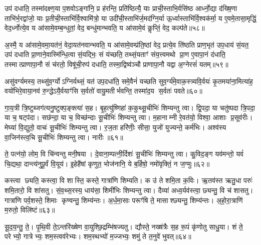 उप॑ दधाति॒ तस्मा॑दक्ष्ण॒या प॒शवोऽङ्गा॑नि॒ प्र ह॑रन्ति॒ प्रति॑ष्ठित्यै॒ याः प्राची॒स्ताभि॒र्वसि॑ष्ठ आर्ध्नो॒द्या द॑ख्षि॒णा ताभि॑र्भ॒रद्वा॑जो॒ याः प्र॒तीची॒स्ताभि॑र्वि॒श्वामि॑त्रो॒ या उदी॑ची॒स्ताभि॑र्ज॒मद॑ग्नि॒र्या ऊ॒र्ध्वास्ताभि॑र्वि॒श्वक॑र्मा॒ य ए॒वमे॒तासा॒मृद्धिं॒ वेद॒र्ध्नोत्ये॒व य आ॑सामे॒वम्ब॒न्धुतां॒ वेद॒ बन्धु॑मान्भवति॒ य आ॑सामे॒वं कॢप्तिं॒ वेद॒ कल्प॑ते॥५८॥

अ॒स्मै॒ य आ॑सामे॒वमा॒यत॑नं॒ वेदा॒यत॑नवान्भवति॒ य आ॑सामे॒वम्प्र॑ति॒ष्ठां वेद॒ प्रत्ये॒व ति॑ष्ठति प्राण॒भृत॑ उप॒धाय॑ सं॒यत॒ उप॑ दधाति प्रा॒णाने॒वास्मि॑न्धि॒त्वा सं॒यद्भिः॒ सं य॑च्छति॒ तथ्सं॒यताꣳ॑ संय॒त्त्वमथो प्रा॒ण ए॒वापा॒नं द॑धाति॒ तस्मात्प्राणापा॒नौ सं च॑रतो॒ विषू॑ची॒रुप॑ दधाति॒ तस्मा॒द्विष्व॑ञ्चौ प्राणापा॒नौ यद्वा अ॒ग्नेरसं॑ यतम्॥५९॥

असु॑वर्ग्यमस्य॒ तथ्सु॑व॒र्ग्योऽग्निर्यथ्सं॒ यत॑ उप॒दधा॑ति॒ समे॒वैनं॑ यच्छति सुव॒र्ग्य॑मे॒वाक॒स्त्र्यवि॒र्वयः॑ कृ॒तमया॑ना॒मित्या॑ह॒ वयो॑भिरे॒वाया॒नव॑ रु॒न्द्धेऽयै॒र्वयाꣳ॑सि स॒र्वतो॑ वायु॒मतीर्भवन्ति॒ तस्मा॑द॒य स॒र्वतः॑ पवते॥६०॥

{\anuvakamend[{प॒श्चादे॒ताः पु॒रोऽक्ष्ण॒या कल्प॒तेऽसं॑ यत॒म्पञ्च॑त्रिशच्च॥10॥}]}

गा॒य॒त्री त्रि॒ष्टुब्जग॑त्यनु॒ष्टुक्प॒ङ्क्त्या॑ स॒ह। बृ॒ह॒त्यु॑ष्णिहा॑ क॒कुथ्सू॒चीभिः॑ शिम्यन्तु त्वा। द्वि॒पदा॒ या चतु॑ष्पदा त्रि॒पदा॒ या च॒ षट्प॑दा। सछ॑न्दा॒ या च॒ विच्छ॑न्दाः सू॒चीभिः॑ शिम्यन्तु त्वा। म॒हानाम्नी रे॒वत॑यो॒ विश्वा॒ आशाः प्र॒सूव॑रीः। मेघ्या॑ वि॒द्युतो॒ वाचः॑ सू॒चीभिः॑ शिम्यन्तु त्वा। र॒ज॒ता हरि॑णीः॒ सीसा॒ युजो॑ युज्यन्ते॒ कर्म॑भिः। अश्व॑स्य वा॒जिन॑स्त्व॒चि सू॒चीभिः॑ शिम्यन्तु त्वा। नारीः॥६१॥

ते॒ पत्न॑यो॒ लोम॒ वि चि॑न्वन्तु मनी॒षया। दे॒वाना॒म्पत्नी॒र्दिशः॑ सू॒चीभिः॑ शिम्यन्तु त्वा। कु॒विद॒ङ्ग यव॑मन्तो॒ यवं॑ चि॒द्यथा॒ दान्त्य॑नुपू॒र्वं वि॒यूय॑। इ॒हेहै॑षां कृणुत॒ भोज॑नानि॒ ये ब॒र्\mbox{}हिषो॒ नमो॑वृक्तिं॒ न ज॒ग्मुः॥६२॥

{\anuvakamend[{नारीस्त्रि॒ꣳ॒शच्च॑॥11॥}]}

कस्त्वा छ्यति॒ कस्त्वा॒ वि शास्ति॒ कस्ते॒ गात्रा॑णि शिम्यति। क उ॑ ते शमि॒ता क॒विः। ऋ॒तव॑स्त ऋतु॒धा परुः॑ शमि॒तारो॒ वि शा॑सतु। सं॒व॒थ्स॒रस्य॒ धाय॑सा॒ शिमी॑भिः शिम्यन्तु त्वा। दैव्या॑ अध्व॒र्यव॑स्त्वा॒ छ्यन्तु॒ वि च॑ शासतु। गात्रा॑णि पर्व॒शस्ते॒ शिमाः कृण्वन्तु॒ शिम्य॑न्तः। अ॒र्ध॒मा॒साः परूꣳ॑षि ते॒ मासाश्छ्यन्तु॒ शिम्य॑न्तः। अ॒हो॒रा॒त्राणि॑ म॒रुतो॒ विलि॑ष्टं॥६३॥

सू॒द॒य॒न्तु॒ ते॒। पृ॒थि॒वी ते॒ऽन्तरि॑ख्षेण वा॒युश्छि॒द्रम्भि॑षज्यतु। द्यौस्ते॒ नख्ष॑त्रैः स॒ह रू॒पं कृ॑णोतु साधु॒या। शं ते॒ परेभ्यो॒ गात्रेभ्यः॒ शम॒स्त्वव॑रेभ्यः। शम॒स्थभ्यो॑ म॒ज्जभ्यः॒ शमु॑ ते त॒नुवे॑ भुवत्॥६४॥

